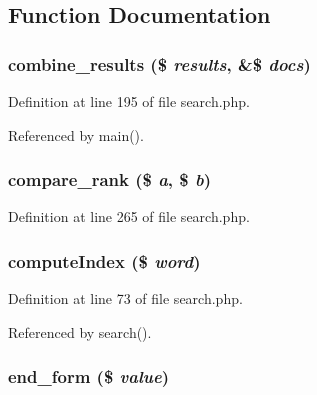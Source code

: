 \subsection{Function Documentation}
\hypertarget{search_8php_cc8965d7253948aba9889870fee87924}{
\subsubsection[combine\_\-results]{\setlength{\rightskip}{0pt plus 5cm}combine\_\-results (\$ {\em results}, \&\$ {\em docs})}}
\label{search_8php_cc8965d7253948aba9889870fee87924}




Definition at line 195 of file search.php.

Referenced by main().\hypertarget{search_8php_0532bbe33ac8a423a76189fa6ba3dd98}{
\subsubsection[compare\_\-rank]{\setlength{\rightskip}{0pt plus 5cm}compare\_\-rank (\$ {\em a}, \$ {\em b})}}
\label{search_8php_0532bbe33ac8a423a76189fa6ba3dd98}




Definition at line 265 of file search.php.\hypertarget{search_8php_f1d20765fec546c31873b0e76c4761f3}{
\subsubsection[computeIndex]{\setlength{\rightskip}{0pt plus 5cm}compute\-Index (\$ {\em word})}}
\label{search_8php_f1d20765fec546c31873b0e76c4761f3}




Definition at line 73 of file search.php.

Referenced by search().\hypertarget{search_8php_095f793952db25774afee6ac14282837}{
\subsubsection[end\_\-form]{\setlength{\rightskip}{0pt plus 5cm}end\_\-form (\$ {\em value})}}
\label{search_8php_095f793952db25774afee6ac14282837}




